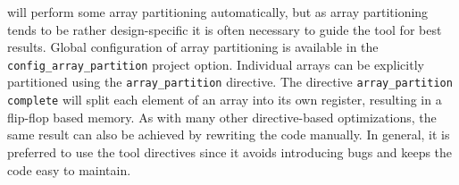 \begin{aside}
\VHLS will perform some array partitioning automatically, but as array partitioning tends to be rather design-specific it is often necessary to guide the tool for best results.  Global configuration of array partitioning is available in the \lstinline|config_array_partition| project option.  Individual arrays can be explicitly partitioned using the \lstinline|array_partition| directive. The directive \lstinline|array_partition complete| will split each element of an array into its own register, resulting in a flip-flop based memory.  As with many other directive-based optimizations, the same result can also be achieved by rewriting the code manually.  In general, it is preferred to use the tool directives since it avoids introducing bugs and keeps the code easy to maintain.
\end{aside}



